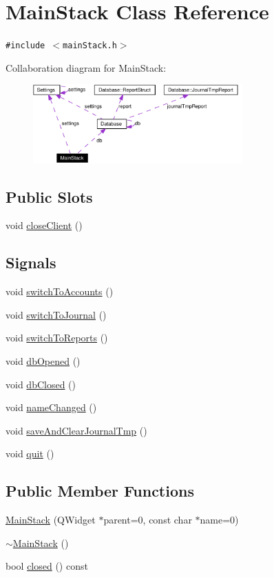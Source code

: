 \hypertarget{classMainStack}{
\section{Main\-Stack Class Reference}
\label{classMainStack}
}
{\tt \#include $<$main\-Stack.h$>$}

Collaboration diagram for Main\-Stack:\begin{figure}[H]
\begin{center}
\leavevmode
\includegraphics[width=228pt]{classMainStack__coll__graph}
\end{center}
\end{figure}
\subsection*{Public Slots}
\begin{CompactItemize}
\item 
void \hyperlink{classMainStack_i0}{close\-Client} ()
\end{CompactItemize}
\subsection*{Signals}
\begin{CompactItemize}
\item 
void \hyperlink{classMainStack_l0}{switch\-To\-Accounts} ()
\item 
void \hyperlink{classMainStack_l1}{switch\-To\-Journal} ()
\item 
void \hyperlink{classMainStack_l2}{switch\-To\-Reports} ()
\item 
void \hyperlink{classMainStack_l3}{db\-Opened} ()
\item 
void \hyperlink{classMainStack_l4}{db\-Closed} ()
\item 
void \hyperlink{classMainStack_l5}{name\-Changed} ()
\item 
void \hyperlink{classMainStack_l6}{save\-And\-Clear\-Journal\-Tmp} ()
\item 
void \hyperlink{classMainStack_l7}{quit} ()
\end{CompactItemize}
\subsection*{Public Member Functions}
\begin{CompactItemize}
\item 
\hyperlink{classMainStack_a0}{Main\-Stack} (QWidget $\ast$parent=0, const char $\ast$name=0)
\item 
\hyperlink{classMainStack_a1}{$\sim$Main\-Stack} ()
\item 
bool \hyperlink{classMainStack_a2}{closed} () const
\end{CompactItemize}

